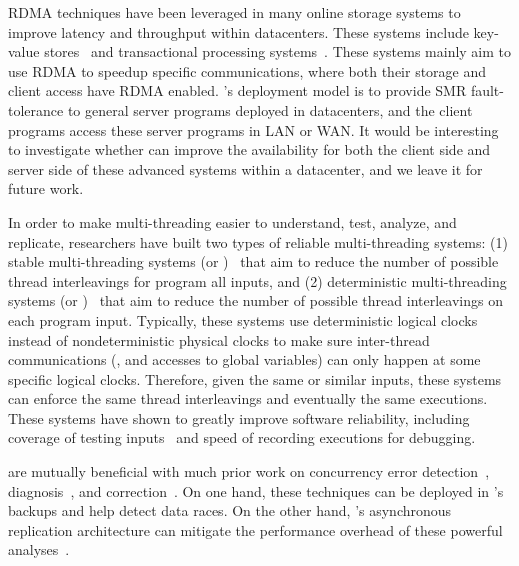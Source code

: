  RDMA techniques have been leveraged in many online 
storage systems to improve latency and throughput within datacenters. These 
systems include key-value 
stores~\cite{pilaf:usenix14,herd:sigcomm14,farm:nsdi14} and 
transactional processing systems~\cite{drtm:sosp15,farm:sosp15}. These systems 
mainly aim to use RDMA to speedup specific communications, where both their 
storage and client access have RDMA enabled. \xxx's deployment model is to 
provide SMR fault-tolerance to general server programs deployed in datacenters, 
and the client programs access these server programs in LAN or WAN. It would be 
interesting to investigate whether \xxx can improve the availability for both 
the client side and server side of these advanced systems within a datacenter, 
and we leave it for future work.



 In order to make multi-threading easier to 
understand, test, analyze, and replicate, researchers have built two types of 
reliable multi-threading systems: (1) stable multi-threading systems (or 
\smt)~\cite{grace:oopsla09, dthreads:sosp11, determinator:osdi10} that aim to 
reduce the number of possible thread interleavings for program all inputs, and 
(2) deterministic multi-threading systems (or \dmt)~\cite{dpj:oopsla09, 
dmp:asplos09,kendo:asplos09,coredet:asplos10,dos:osdi10,ddos:asplos13,
ics:oopsla13} that aim to reduce the number of possible thread interleavings on 
each program input. Typically, these systems use deterministic logical clocks 
instead of nondeterministic physical clocks to make sure inter-thread 
communications (\eg, \mutexlock and accesses to global variables) can only 
happen at some specific logical clocks. Therefore, given the same or similar 
inputs, these systems can enforce the same thread interleavings and eventually 
the same executions. These systems 
have shown to greatly improve software reliability, including coverage of 
testing inputs~\cite{ics:oopsla13} and speed of recording 
executions\cite{dos:osdi10} for debugging.

 \xxx are mutually beneficial with much prior work on 
concurrency error 
detection~\cite{yu:racetrack:sosp,savage:eraser,racerx:sosp03,lu:muvi:sosp,
avio:asplos06,conmem:asplos10},
diagnosis~\cite{racefuzzer:pldi08,ctrigger:asplos09,atomfuzzer:fse08}, and
correction~\cite{dimmunix:osdi08,gadara:osdi08,wu:loom:osdi10,cfix:osdi12}. 
On one hand, these techniques can be deployed in \xxx's backups and help 
\xxx detect data races. On the other hand, \xxx's asynchronous replication 
architecture can mitigate the performance overhead of these powerful 
analyses~\cite{repframe:apsys15}.


